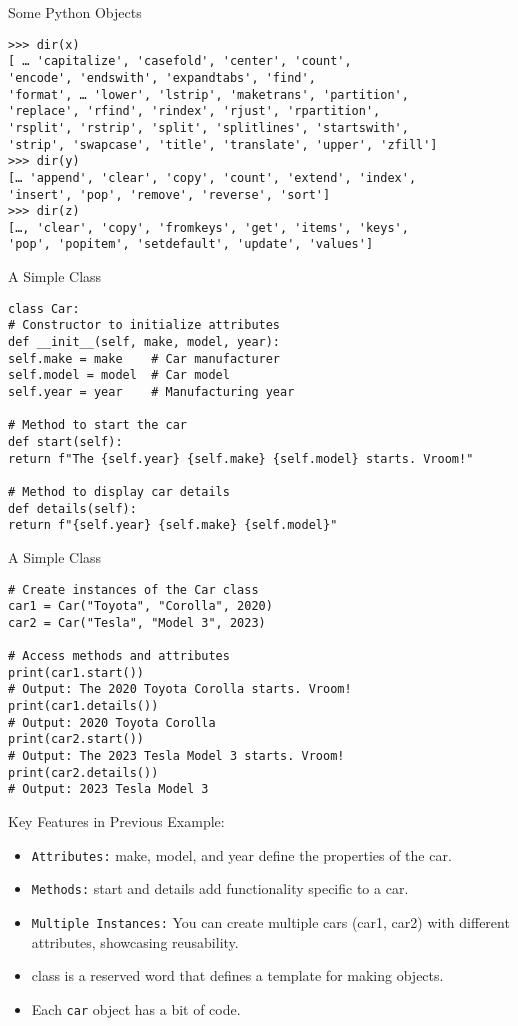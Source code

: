 \documentclass[serif, aspectratio=169]{beamer}
\begin{document}
\begin{frame}[fragile]{Some Python Objects}
	\begin{lstlisting}
>>> dir(x)
[ … 'capitalize', 'casefold', 'center', 'count', 
'encode', 'endswith', 'expandtabs', 'find', 
'format', … 'lower', 'lstrip', 'maketrans', 'partition', 
'replace', 'rfind', 'rindex', 'rjust', 'rpartition', 
'rsplit', 'rstrip', 'split', 'splitlines', 'startswith',
'strip', 'swapcase', 'title', 'translate', 'upper', 'zfill']
>>> dir(y)
[… 'append', 'clear', 'copy', 'count', 'extend', 'index',
'insert', 'pop', 'remove', 'reverse', 'sort']
>>> dir(z)
[…, 'clear', 'copy', 'fromkeys', 'get', 'items', 'keys',
'pop', 'popitem', 'setdefault', 'update', 'values']
	\end{lstlisting}
\end{frame}

\begin{frame}[fragile]{A Simple Class}
    \begin{lstlisting}
class Car:
# Constructor to initialize attributes
def __init__(self, make, model, year):
self.make = make    # Car manufacturer
self.model = model  # Car model
self.year = year    # Manufacturing year
	
# Method to start the car
def start(self):
return f"The {self.year} {self.make} {self.model} starts. Vroom!"
	
# Method to display car details
def details(self):
return f"{self.year} {self.make} {self.model}"	
    \end{lstlisting}
\end{frame}

\begin{frame}[fragile]{A Simple Class}
    \begin{lstlisting}
# Create instances of the Car class
car1 = Car("Toyota", "Corolla", 2020)
car2 = Car("Tesla", "Model 3", 2023)
	
# Access methods and attributes
print(car1.start())      
# Output: The 2020 Toyota Corolla starts. Vroom!
print(car1.details())     
# Output: 2020 Toyota Corolla
print(car2.start())       
# Output: The 2023 Tesla Model 3 starts. Vroom!
print(car2.details())     
# Output: 2023 Tesla Model 3	
    \end{lstlisting}
\end{frame}

\begin{frame}{Key Features in Previous Example:}
    \begin{itemize}
        \item \texttt{\color{red}Attributes:} make, model, and year define the properties of the car.
        \item \texttt{\color{red}Methods:} start and details add functionality specific to a car.
        \item \texttt{\color{red}Multiple Instances:} You can create multiple cars (car1, car2) with different attributes, showcasing reusability.
        \item class is a reserved word  that defines a template for making objects.
        \item Each \texttt{\color{red}car} object has a bit of code.
    \end{itemize}
\end{frame}
\end{document}
